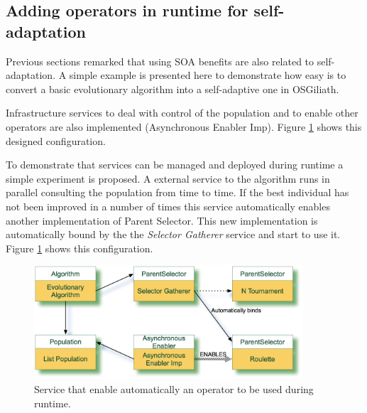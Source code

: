 \subsection{Adding operators in runtime for self-adaptation} %

Previous sections remarked that using SOA benefits are also related
to self-adaptation. A simple example is presented here to demonstrate
how easy is to convert a basic evolutionary algorithm into a
self-adaptive one in OSGiliath. 


Infrastructure services to deal with control of the population and to enable other operators are also implemented (Asynchronous Enabler Imp). Figure \ref{fig:osgiliath:enabler} shows this designed configuration.

To demonstrate that services can be managed and deployed during runtime a simple experiment is proposed. A external service to the algorithm runs in parallel consulting the population from time to time. If the best individual has not been improved in a number of times this service automatically enables another implementation of Parent Selector. This new implementation is automatically bound by the the {\em Selector Gatherer} service and start to use it. Figure \ref{fig:osgiliath:enabler} shows this configuration.

\begin{figure}
\centering
\includegraphics[width=10cm]{gfx/osgiliath/enabler.jpg}
\caption{Service that enable automatically an operator to be used during runtime.}
\label{fig:osgiliath:enabler}
\end{figure}


